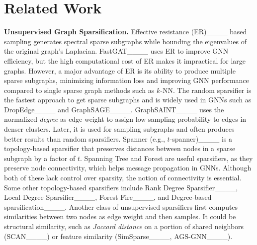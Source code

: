 \section{Related Work}
\label{sec:related}



\noindent\textbf{Unsupervised Graph Sparsification.} 
Effective resistance (ER)____ based sampling generates spectral sparse subgraphs while bounding the eigenvalues of the original graph's Laplacian. FastGAT____ uses ER to improve GNN efficiency, but the high computational cost of ER makes it impractical for large graphs.  However, a major advantage of ER is its ability to produce multiple sparse subgraphs, minimizing information loss and improving GNN performance compared to single sparse graph methods such as $k$-NN.
The random sparsifier is the fastest approach to get sparse subgraphs and is widely used in GNNs such as DropEdge____ and GraphSAGE____. GraphSAINT____ uses the normalized \emph{degree} as edge weight to assign low sampling probability to edges in denser clusters. Later, it is used for sampling subgraphs and often produces better results than random sparsifiers. 
Spanner (e.g., $t$-spanner)____ is a topology-based sparsifier that preserves distances between nodes in a sparse subgraph by a factor of $t$. 
Spanning Tree and Forest are useful sparsifiers, as they preserve node connectivity, which helps message propagation in GNNs. Although both of these lack control over sparsity, the notion of connectivity is essential. %
Some other topology-based sparsifiers include  Rank Degree Sparsifier____, Local Degree Sparsifier____,
Forest Fire____, and Degree-based sparsification____.
Another class of unsupervised sparsifiers first computes similarities between two nodes as edge weight and then 
samples. It could be structural similarity, such as \emph{Jaccard distance} on a portion of shared neighbors (SCAN____) or feature similarity (SimSparse____, AGS-GNN____).

